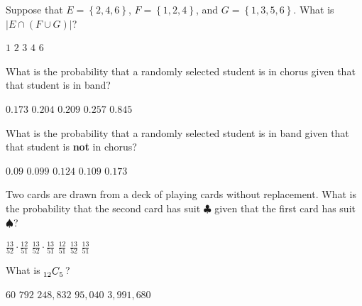\documentclass[answers,12pt]{exam}
\newcommand\ncr[2]{\tensor[_{#1}]C{_{#2}}}
\begin{document}
\begin{questions}
\question Suppose that $E=\left\{2,4,6\right\}$,
$F=\left\{1,2,4\right\}$, and $G=\left\{1,3,5,6\right\}$.
What is $\left|E\cap\left(F\cup G\right)\right|$?\\
\begin{oneparchoices}
\choice $1$
\choice $2$
\correctchoice $3$
\choice $4$
\choice $6$
\end{oneparchoices}


\question\label{FirstAmes} What is the probability that a randomly selected
student is in chorus given that that student is in band?\\
\begin{oneparchoices}
\choice $0.173$ %
\correctchoice $0.204$
\choice $0.209$ %
\choice $0.257$ %
\choice $0.845$ %
\end{oneparchoices}

\question\label{LastAmes} What is the probability that a randomly selected
student is in band given that that student is {\bf not} in chorus?\\
\begin{oneparchoices}
\correctchoice $0.09$
\choice $0.099$ %
\choice $0.124$ %
\choice $0.109$ %
\choice $0.173$ %
\end{oneparchoices}

\question Two cards are drawn from a deck of playing cards
without replacement. What is the probability that
the second card has suit $\clubsuit$ given that the
first card has suit $\spadesuit$?\\
\begin{oneparchoices}
\choice $\frac{13}{52}\cdot\frac{12}{51}$
\choice $\frac{13}{52}\cdot\frac{13}{51}$
\choice $\frac{12}{51}$
\choice $\frac{13}{52}$
\correctchoice $\frac{13}{51}$
\end{oneparchoices}

\question What is $\ncr{12}{5}$?\\
\begin{oneparchoices}
\choice $60$ %
\correctchoice $792$
\choice $248,832$ %
\choice $95,040$ %
\choice $3,991,680$ %
\end{oneparchoices}


\end{questions}
\end{document}
